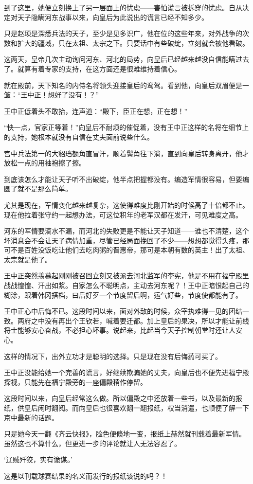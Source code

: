 到了这里，她便立刻换上了另一层面上的忧虑——害怕谎言被拆穿的忧虑。自从决定对天子隐瞒河东战事以来，向皇后为此说出的谎言已经不知多少。

只是赵顼是深悉兵法的天子，至少是见多识广，他在位的这些年来，对外战争的次数和扩大的疆域，只在太祖、太宗之下。只要话中有些破绽，立刻就会被他看破。

这两天，皇帝几次主动询问河东、河北的局势，向皇后已经越来越没自信能瞒过去了。就算有着专家的支持，在这方面还是很难维持着信心。

就在殿前，天下知名的内侍名将领头迎接皇后的鸾驾。看到他，向皇后双眉便是一皱：“王中正！想好了没有！？”

王中正低着头不敢抬，连声道：“殿下，臣正在想，正在想！”

“快一点，官家正等着！”向皇后不耐烦的催促着，没有王中正这样的名将在细节上的支持，她根本就没有自信在丈夫面前说些什么。

宫中兵法第一的大貂珰额角直冒汗，顺着鬓角往下淌，直到向皇后转身离开，他才放松一点的用袖袍擦了擦。

到底该怎么才能让天子听不出破绽，他半点把握都没有。编造军情很容易，但要编圆了就不是那么简单。

尤其是现在，军情变化越来越复杂，这使得难度比刚开始的时候高了十倍都不止。现在他拉着张守约一起想办法，可这位积年的老军汉都在发汗，可见难度之高。

河东的军情要滴水不漏，而河北的失败更是不能让天子知道——谁也不清楚，这个坏消息会不会让天子病情加重，尽管已经局面挽回了不少——想想都觉得头疼，那可不是百姓没饭吃让他们去吃肉粥的晋惠帝，那可是本朝有数的英主！出了太祖、太宗就是他了。

王中正突然羡慕起刚刚被召回立刻又被派去河北监军的李宪，他是不用在福宁殿里战战惶惶、汗出如浆。自家怎么不聪明点，主动去河东呢？！王中正暗恨起自己的糊涂，跟着韩冈搭档，曰后好歹一个节度留后啊，运气好些，节度使都能有了。

王中正心中后悔不已。这段时间以来，面对外敌的时候，众宰执难得一见的团结一致。两府之中没有再出个王钦若，喊着要迁都。加上皇后的果决，所以才能让前线将士能够安心奋战，不必担心坏事。说起来，比起当今天子控制朝堂时还让人安心。

这样的情况下，出外立功才是聪明的选择。只是现在没有后悔药可买了。

王中正没能给她一个完善的谎言，好继续欺骗她的丈夫，向皇后也不便先进福宁殿探视，只能先在福宁殿旁的一座偏殿稍作停留。

这段时间以来，向皇后经常这么做。所以偏殿之中还放着一些书，以及最新的报纸，供皇后闲时翻阅。而向皇后也很喜欢翻一翻报纸，权当消遣，也顺便了解一下京中最新的话题。

只是她今天一翻《齐云快报》，脸色便倏地一变，报纸上赫然就刊载着最新军情。虽然这也不算什么，但更进一步的评论就让人无法容忍了。

‘辽贼歼狡，实有诡谋。’

这是以刊载球赛结果的名义而发行的报纸该说的吗？！
